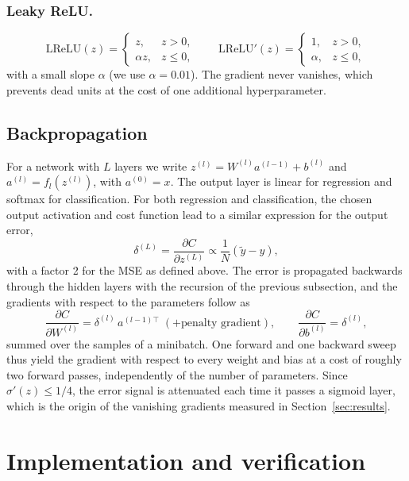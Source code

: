 \documentclass[amssymb,twocolumn,aps]{revtex4}
\begin{document}
\subsubsection{Leaky ReLU.}
\begin{equation}
\mathrm{LReLU}(z)=\begin{cases}z,&z>0,\\\alpha z,&z\le 0,\end{cases}
\qquad
\mathrm{LReLU}'(z)=\begin{cases}1,&z>0,\\\alpha,&z\le 0,\end{cases}
\end{equation}
with a small slope $\alpha$ (we use $\alpha=0.01$). The gradient never vanishes, which prevents dead units at the cost of one additional hyperparameter.

\subsection{Backpropagation}
For a network with $L$ layers we write $z^{(l)}=W^{(l)}a^{(l-1)}+b^{(l)}$ and $a^{(l)}=f_l\!\left(z^{(l)}\right)$, with $a^{(0)}=x$. The output layer is linear for regression and softmax for classification. For both regression and classification, the chosen output activation and cost function lead to a similar expression for the output error,
\begin{equation}
\delta^{(L)}=\frac{\partial C}{\partial z^{(L)}}\propto\frac{1}{N}\left(\tilde y-y\right),
\end{equation}
with a factor 2 for the MSE as defined above. The error is propagated backwards through the hidden layers with the recursion of the previous subsection, and the gradients with respect to the parameters follow as
\begin{equation}
\frac{\partial C}{\partial W^{(l)}}=\delta^{(l)}\,a^{(l-1)\top}\;(+\text{penalty gradient}),\qquad
\frac{\partial C}{\partial b^{(l)}}=\delta^{(l)} ,
\end{equation}
summed over the samples of a minibatch. One forward and one backward sweep thus yield the gradient with respect to every weight and bias at a cost of roughly two forward passes, independently of the number of parameters. Since $\sigma'(z)\le 1/4$, the error signal is attenuated each time it passes a sigmoid layer, which is the origin of the vanishing gradients measured in Section~\ref{sec:results}.

\section{Implementation and verification} \label{sec:implementation}
\end{document}
